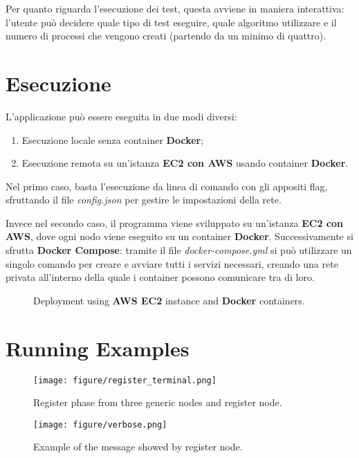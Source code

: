 \documentclass[conference]{IEEEtran}
\begin{document}
Per quanto riguarda l'esecuzione dei test, questa avviene in maniera interattiva: l'utente può decidere quale tipo di test eseguire, quale algoritmo utilizzare e il numero di processi che vengono creati (partendo da un minimo di quattro).


\section{Esecuzione}

L'applicazione può essere eseguita in due modi diversi:
\begin{enumerate}
    \item Esecuzione locale senza container \textbf{Docker};
    \item Esecuzione remota su un'istanza \textbf{EC2 con AWS} usando container \textbf{Docker}.
\end{enumerate}

Nel primo caso, basta l'esecuzione da linea di comando con gli appositi flag, sfruttando il file \textit{config.json} per gestire le impostazioni della rete.

Invece nel secondo caso, il programma viene sviluppato su un'istanza \textbf{EC2 con AWS}, dove ogni nodo viene eseguito su un container \textbf{Docker}.
Successivamente si sfrutta \textbf{Docker Compose}: tramite il file \textit{docker-compose.yml} si può utilizzare un singolo comando per creare e avviare tutti i servizi necessari, creando una rete privata all'interno della quale i container possono comunicare tra di loro.

\begin{figure}[htbp]\label{fig:arch}
  \centering
  
  \caption{Deployment using \textbf{AWS EC2} instance and \textbf{Docker} containers.}
\end{figure}


\section{Running Examples}

\begin{figure}[htb]\label{fig:register}
\texttt{[image: figure/register\_terminal.png]}
\caption{Register phase from three generic nodes and register node.}
\end{figure}

\begin{figure}[htb]\label{fig:verbose}
\texttt{[image: figure/verbose.png]}
\caption{Example of the message showed by register node.}
\end{figure}
\end{document}
